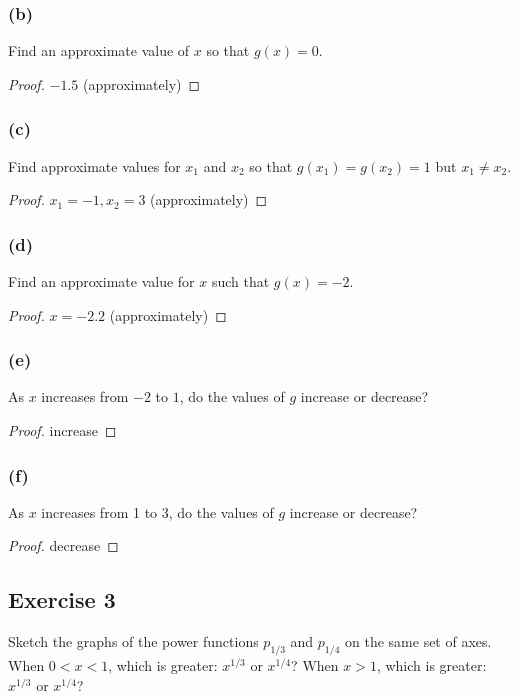 \documentclass[14pt]{extarticle}
\begin{document}
\subsubsection{(b)}
Find an approximate value of \(x\) so that \(g(x) = 0\).
\begin{proof}
    \(-1.5\) (approximately)
\end{proof}

\subsubsection{(c)}
Find approximate values for \(x_1\) and \(x_2\) so that \(g(x_1) = g(x_2) = 1\) but \(x_1 \neq x_2\).
\begin{proof}
    \(x_1 = -1, x_2 = 3\) (approximately)
\end{proof}

\subsubsection{(d)}
Find an approximate value for \(x\) such that \(g(x) = -2\).
\begin{proof}
    \(x = -2.2\) (approximately)
\end{proof}

\subsubsection{(e)}
As \(x\) increases from \(-2\) to \(1\), do the values of \(g\) increase or decrease?

\begin{proof}
    increase
\end{proof}

\subsubsection{(f)}
As \(x\) increases from 1 to 3, do the values of \(g\) increase or decrease?

\begin{proof}
    decrease
\end{proof}

\subsection{Exercise 3}
Sketch the graphs of the power functions \(p_{1/3}\) and \(p_{1/4}\) on the same set of axes. When \(0 < x < 1\), which
is greater: \(x^{1/3}\) or \(x^{1/4}\)? When \(x > 1\), which is greater: \(x^{1/3}\) or \(x^{1/4}\)?
\end{document}

